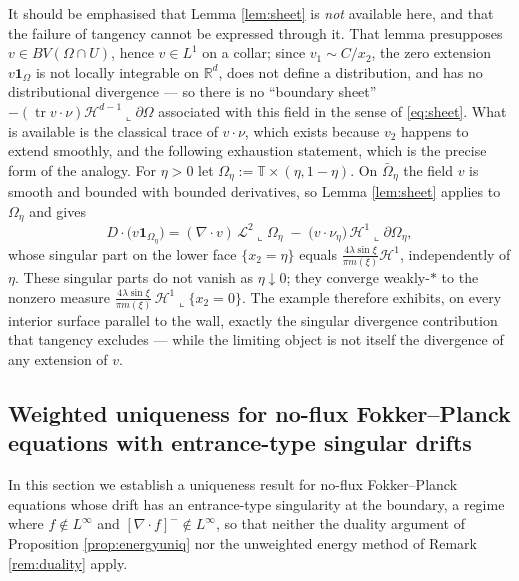 \documentclass[11pt]{amsart}
\theoremstyle{definition}
\newcommand{\LL}[1]{\mathcal{L}^{#1}}
\newcommand{\Hd}{\mathcal{H}^{d-1}}
\newcommand{\tr}{\operatorname{tr}}
\newcommand{\dive}{\nabla\!\cdot}
\newcommand{\R}{\mathbb{R}}
\newcommand{\T}{\mathbb{T}}
\begin{document}
It should be emphasised that Lemma \ref{lem:sheet} is
\emph{not} available here, and that the failure of tangency cannot
be expressed through it. That lemma presupposes $v\in
BV(\Omega\cap U)$, hence $v\in L^1$ on a collar; since $v_1\sim
C/x_2$, the zero extension $v\mathbf{1}_\Omega$ is not locally
integrable on $\R^d$, does not define a distribution, and has no
distributional divergence --- so there is no ``boundary sheet''
$-(\tr v\cdot\nu)\Hd\llcorner\partial\Omega$ associated with this
field in the sense of \eqref{eq:sheet}. What is available is the
classical trace of $v\cdot\nu$, which exists because $v_2$ happens
to extend smoothly, and the following exhaustion statement, which is
the precise form of the analogy. For $\eta>0$ let
$\Omega_\eta:=\T\times(\eta,1-\eta)$. On $\bar\Omega_\eta$ the field
$v$ is smooth and bounded with bounded derivatives, so Lemma
\ref{lem:sheet} applies to $\Omega_\eta$ and gives
\[
D\!\cdot\big(v\mathbf{1}_{\Omega_\eta}\big)
=(\dive v)\,\LL{2}\llcorner\Omega_\eta
\;-\;\big(v\cdot\nu_\eta\big)\,
\mathcal{H}^{1}\llcorner\partial\Omega_\eta ,
\]
whose singular part on the lower face $\{x_2=\eta\}$ equals
$\tfrac{4\lambda\sin\xi}{\pi m(\xi)}\mathcal{H}^1$, independently of
$\eta$. These singular parts do not vanish as $\eta\downarrow0$;
they converge weakly-$*$ to the nonzero measure
$\tfrac{4\lambda\sin\xi}{\pi m(\xi)}\,\mathcal{H}^1\llcorner\{x_2=0\}$.
The example therefore exhibits, on every interior surface parallel
to the wall, exactly the singular divergence contribution that
tangency excludes --- while the limiting object is not itself the
divergence of any extension of $v$.
\subsection{Weighted uniqueness for no-flux Fokker--Planck equations
with entrance-type singular drifts}\label{app:weighted}


In this section we establish a uniqueness result 
for no-flux
Fokker--Planck equations whose drift has an entrance-type
singularity at the boundary, a regime where $f\notin L^\infty$ and
$[\dive f]^-\notin L^\infty$, so that neither the duality argument
of Proposition \ref{prop:energyuniq} nor the unweighted energy
method of Remark \ref{rem:duality} apply.
\end{document}

